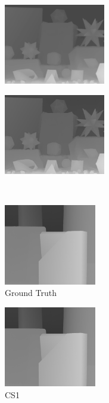 \documentclass[preprint,10pt,5p,times,twocolumn]{elsarticle}
\begin{document}
\begin{figure}
\begin{subfigure}[b]{0.24\textwidth}
\end{subfigure}
\begin{subfigure}[b]{0.24\textwidth}
\includegraphics[height= 3.5cm, width=\textwidth]{fig_moebius_8X_cvpr.png}
\end{subfigure}
\begin{subfigure}[b]{0.24\textwidth}
\includegraphics[height= 3.5cm, width=\textwidth]{fig_moebius_8X_iccv.png}
\end{subfigure}
\\ \vspace{0.1cm}
\begin{subfigure}[b]{0.24\textwidth}
\includegraphics[height= 3.5cm, width=\textwidth]{fig_plastic.png}
\caption*{Ground Truth}
\end{subfigure}
\begin{subfigure}[b]{0.24\textwidth}
\includegraphics[height= 3.5cm, width=\textwidth]{fig_plastic_8X_lqdai.png}
\caption*{CS{1}}
\end{subfigure}
\begin{subfigure}[b]{0.24\textwidth}

\end{subfigure}
\end{figure}
\end{document}
